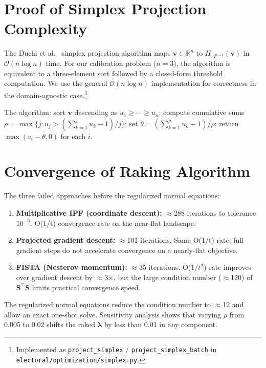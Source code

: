 \documentclass[12pt, letterpaper]{article}
\theoremstyle{definition}
\begin{document}
\appendix

\section{Proof of Simplex Projection Complexity}
\label{app:simplex}

The Duchi et al.\ \citeyear{Duchi2008} simplex projection algorithm maps
$\mathbf{v} \in \mathbb{R}^n$ to $\Pi_{\Delta^{n-1}}(\mathbf{v})$ in
$\mathcal{O}(n \log n)$ time. For our calibration problem ($n = 3$), the
algorithm is equivalent to a three-element sort followed by a closed-form
threshold computation. We use the general $\mathcal{O}(n \log n)$
implementation for correctness in the domain-agnostic case.\footnote{Implemented
as \texttt{project\_simplex} / \texttt{project\_simplex\_batch} in
\texttt{electoral/optimization/simplex.py}.}

The algorithm: sort $\mathbf{v}$ descending as $u_1 \geq \cdots \geq u_n$;
compute cumulative sums $\rho = \max\{j : u_j > (\sum_{k=1}^j u_k - 1)/j\}$;
set $\theta = (\sum_{k=1}^{\rho} u_k - 1)/\rho$;
return $\max(v_i - \theta, 0)$ for each $i$.

\section{Convergence of Raking Algorithm}
\label{app:raking}

The three failed approaches before the regularized normal equations:

\begin{enumerate}
  \item \textbf{Multiplicative IPF (coordinate descent):} $\approx$288 iterations
    to tolerance $10^{-6}$. O(1/t) convergence rate on the near-flat landscape.

  \item \textbf{Projected gradient descent:} $\approx$101 iterations. Same
    O(1/t) rate; full-gradient steps do not accelerate convergence on a
    nearly-flat objective.

  \item \textbf{FISTA (Nesterov momentum):} $\approx$35 iterations.
    O(1/$t^2$) rate improves over gradient descent by $\approx$3$\times$,
    but the large condition number ($\approx$120) of $\mathbf{S}^\top\mathbf{S}$
    limits practical convergence speed.
\end{enumerate}

The regularized normal equations reduce the condition number to $\approx$12
and allow an exact one-shot solve. Sensitivity analysis shows that varying
$\rho$ from 0.005 to 0.02 shifts the raked $\boldsymbol{\lambda}$ by less
than 0.01 in any component.
\end{document}
